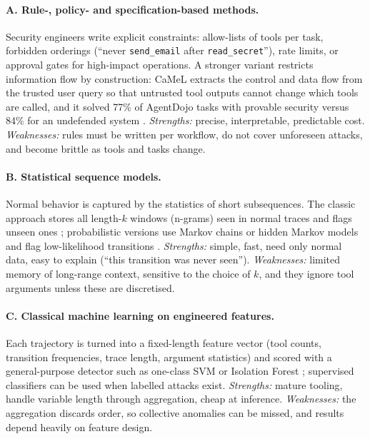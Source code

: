 \documentclass[11pt,a4paper]{article}
\begin{document}
\paragraph{A. Rule-, policy- and specification-based methods.} Security engineers write explicit constraints: allow-lists of tools per task, forbidden orderings (``never \texttt{send\_email} after \texttt{read\_secret}''), rate limits, or approval gates for high-impact operations. A stronger variant restricts information flow by construction: CaMeL extracts the control and data flow from the trusted user query so that untrusted tool outputs cannot change which tools are called, and it solved 77\% of AgentDojo tasks with provable security versus 84\% for an undefended system \citep{debenedetti2025camel}. \emph{Strengths:} precise, interpretable, predictable cost. \emph{Weaknesses:} rules must be written per workflow, do not cover unforeseen attacks, and become brittle as tools and tasks change.

\paragraph{B. Statistical sequence models.} Normal behavior is captured by the statistics of short subsequences. The classic approach stores all length-$k$ windows (n-grams) seen in normal traces and flags unseen ones \citep{forrest1996sense}; probabilistic versions use Markov chains or hidden Markov models and flag low-likelihood transitions \citep{chandola2012discrete}. \emph{Strengths:} simple, fast, need only normal data, easy to explain (``this transition was never seen''). \emph{Weaknesses:} limited memory of long-range context, sensitive to the choice of $k$, and they ignore tool arguments unless these are discretised.

\paragraph{C. Classical machine learning on engineered features.} Each trajectory is turned into a fixed-length feature vector (tool counts, transition frequencies, trace length, argument statistics) and scored with a general-purpose detector such as one-class SVM \citep{scholkopf2001oneclass} or Isolation Forest \citep{liu2008isolation}; supervised classifiers can be used when labelled attacks exist. \emph{Strengths:} mature tooling, handle variable length through aggregation, cheap at inference. \emph{Weaknesses:} the aggregation discards order, so collective anomalies can be missed, and results depend heavily on feature design.
\end{document}
